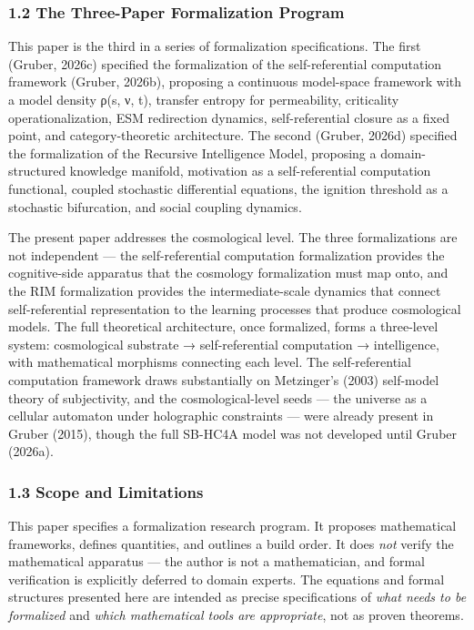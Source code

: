 \documentclass[
]{article}
\begin{document}
\hypertarget{the-three-paper-formalization-program}{%
\subsubsection{1.2 The Three-Paper Formalization
Program}\label{the-three-paper-formalization-program}}

This paper is the third in a series of formalization specifications. The
first (Gruber, 2026c) specified the formalization of the
self-referential computation framework (Gruber, 2026b), proposing a
continuous model-space framework with a model density ρ(s, ν, t),
transfer entropy for permeability, criticality operationalization, ESM
redirection dynamics, self-referential closure as a fixed point, and
category-theoretic architecture. The second (Gruber, 2026d) specified
the formalization of the Recursive Intelligence Model, proposing a
domain-structured knowledge manifold, motivation as a self-referential
computation functional, coupled stochastic differential equations, the
ignition threshold as a stochastic bifurcation, and social coupling
dynamics.

The present paper addresses the cosmological level. The three
formalizations are not independent --- the self-referential computation
formalization provides the cognitive-side apparatus that the cosmology
formalization must map onto, and the RIM formalization provides the
intermediate-scale dynamics that connect self-referential representation
to the learning processes that produce cosmological models. The full
theoretical architecture, once formalized, forms a three-level system:
cosmological substrate → self-referential computation → intelligence,
with mathematical morphisms connecting each level. The self-referential
computation framework draws substantially on Metzinger's (2003)
self-model theory of subjectivity, and the cosmological-level seeds ---
the universe as a cellular automaton under holographic constraints ---
were already present in Gruber (2015), though the full SB-HC4A model was
not developed until Gruber (2026a).

\hypertarget{scope-and-limitations}{%
\subsubsection{1.3 Scope and Limitations}\label{scope-and-limitations}}

This paper specifies a formalization research program. It proposes
mathematical frameworks, defines quantities, and outlines a build order.
It does \emph{not} verify the mathematical apparatus --- the author is
not a mathematician, and formal verification is explicitly deferred to
domain experts. The equations and formal structures presented here are
intended as precise specifications of \emph{what needs to be formalized}
and \emph{which mathematical tools are appropriate}, not as proven
theorems.
\end{document}
